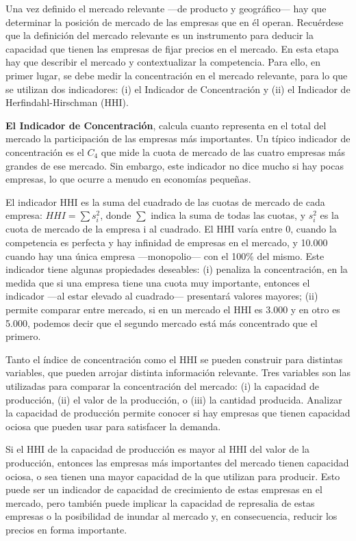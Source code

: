 \documentclass[
  12pt,
  spanish,
]{book}
\begin{document}
Una vez definido el mercado relevante ---de producto y geográfico--- hay que determinar la posición de mercado de las empresas que en él operan. Recuérdese que la definición del mercado relevante es un instrumento para deducir la capacidad que tienen las empresas de fijar precios en el mercado. En esta etapa hay que describir el mercado y contextualizar la competencia. Para ello, en primer lugar, se debe medir la concentración en el mercado relevante, para lo que se utilizan dos indicadores: (i) el Indicador de Concentración y (ii) el Indicador de Herfindahl-Hirschman (HHI).

\textbf{El Indicador de Concentración}, calcula cuanto representa en el total del mercado la participación de las empresas más importantes. Un típico indicador de concentración es el \(C_4\) que mide la cuota de mercado de las cuatro empresas más grandes de ese mercado. Sin embargo, este indicador no dice mucho si hay pocas empresas, lo que ocurre a menudo en economías pequeñas.

El indicador HHI es la suma del cuadrado de las cuotas de mercado de cada empresa: \(HHI = \sum s_i^2\), donde \(\sum\) indica la suma de todas las cuotas, y \(s_i^2\) es la cuota de mercado de la empresa i al cuadrado. El HHI varía entre 0, cuando la competencia es perfecta y hay infinidad de empresas en el mercado, y 10.000 cuando hay una única empresa ---monopolio--- con el 100\% del mismo. Este indicador tiene algunas propiedades deseables: (i) penaliza la concentración, en la medida que si una empresa tiene una cuota muy importante, entonces el indicador ---al estar elevado al cuadrado--- presentará valores mayores; (ii) permite comparar entre mercado, si en un mercado el HHI es 3.000 y en otro es 5.000, podemos decir que el segundo mercado está más concentrado que el primero.

Tanto el índice de concentración como el HHI se pueden construir para distintas variables, que pueden arrojar distinta información relevante. Tres variables son las utilizadas para comparar la concentración del mercado: (i) la capacidad de producción, (ii) el valor de la producción, o (iii) la cantidad producida. Analizar la capacidad de producción permite conocer si hay empresas que tienen capacidad ociosa que pueden usar para satisfacer la demanda.

Si el HHI de la capacidad de producción es mayor al HHI del valor de la producción, entonces las empresas más importantes del mercado tienen capacidad ociosa, o sea tienen una mayor capacidad de la que utilizan para producir. Esto puede ser un indicador de capacidad de crecimiento de estas empresas en el mercado, pero también puede implicar la capacidad de represalia de estas empresas o la posibilidad de inundar al mercado y, en consecuencia, reducir los precios en forma importante.
\end{document}
